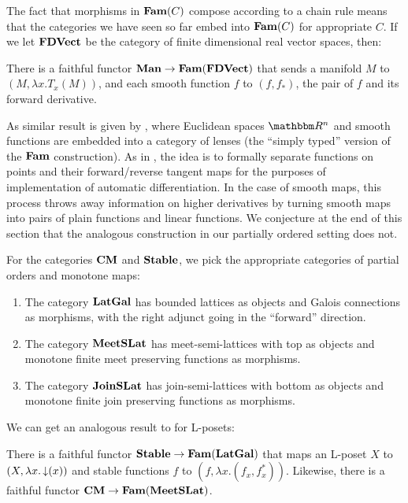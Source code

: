 The fact that morphisms in $\mathbf{Fam}(C)$ compose according to a chain rule
means that the categories we have seen so far embed into $\mathbf{Fam}(C)$ for
appropriate $C$. If we let $\mathbf{FDVect}$ be the category of finite
dimensional real vector spaces, then:

\begin{proposition}
  \label{prop:embed-manifolds}
  There is a faithful functor $\mathbf{Man} \to \mathbf{Fam}(\mathbf{FDVect})$ that sends a
  manifold $M$ to $(M, \lambda x. T_x(M))$, and each smooth function
  $f$ to $(f, f_*)$, the pair of $f$ and its forward derivative.
\end{proposition}

As similar result is given by \citet{cruttwell2022}, where Euclidean
spaces $\RR^n$ and smooth functions are embedded into a category of
lenses (the ``simply typed'' version of the $\mathbf{Fam}$ construction). As
in \cite{vakar2021}, the idea is to formally separate functions on
points and their forward/reverse tangent maps for the purposes of
implementation of automatic differentiation. In the case of smooth
maps, this process throws away information on higher derivatives by
turning smooth maps into pairs of plain functions and linear
functions. We conjecture at the end of this section that the analogous
construction in our partially ordered setting does not.

For the categories $\mathbf{CM}$ and $\mathbf{Stable}$, we pick the appropriate
categories of partial orders and monotone maps:

\begin{definition}
  \begin{enumerate}
  \item The category $\mathbf{LatGal}$ has bounded lattices as objects and
    Galois connections as morphisms, with the right adjunct going in
    the ``forward'' direction.
  \item The category $\mathbf{MeetSLat}$ has meet-semi-lattices with top as
    objects and monotone finite meet preserving functions as
    morphisms.
  \item The category $\mathbf{JoinSLat}$ has join-semi-lattices with bottom as
    objects and monotone finite join preserving functions as
    morphisms.
  \end{enumerate}
\end{definition}

We can get an analogous result to  for L-posets:

\begin{proposition}
  \label{prop:embed-stable}
  There is a faithful functor $\mathbf{Stable} \to \mathbf{Fam}(\mathbf{LatGal})$ that maps an
  L-poset $X$ to $(X, \lambda x. \mathop{\downarrow}(x))$ and stable functions
  $f$ to $(f, \lambda x. (f_x, f^*_x))$. Likewise, there is a faithful
  functor $\mathbf{CM} \to \mathbf{Fam}(\mathbf{MeetSLat})$.
\end{proposition}

